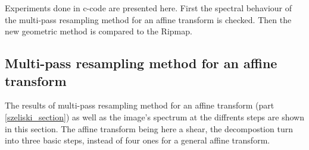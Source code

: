 	Experiments done in c-code are presented here. First the spectral behaviour of the multi-pass resampling method for an affine transform is checked. Then the new geometric method is compared to the Ripmap.


\subsection{Multi-pass resampling method for an affine transform}

 
 
 The results of multi-pass resampling method for an affine transform \cite{szeliski2010high} (part \ref{szeliski_section}) as well as the image's spectrum at the diffrents steps are shown in this section. The affine transform being here a shear, the decompostion turn into three basic steps, instead of four ones for a general affine transform.  
 
 
